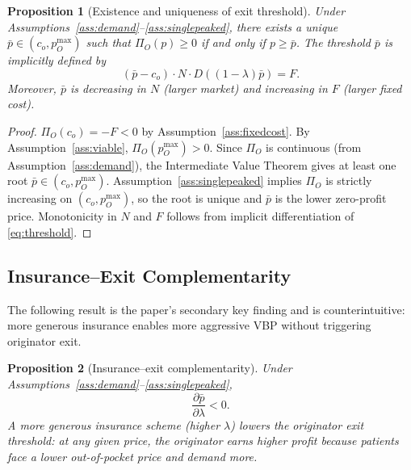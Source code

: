 \documentclass[12pt]{article}
\theoremstyle{plain}
\newtheorem{proposition}{Proposition}
\theoremstyle{definition}
\theoremstyle{remark}
\newcommand{\pbar}{\bar{p}}
\newcommand{\1}{\mathbf{1}}
\begin{document}
\begin{proposition}[Existence and uniqueness of exit threshold]
\label{prop:threshold}
Under Assumptions~\ref{ass:demand}--\ref{ass:singlepeaked}, there exists a unique $\pbar \in (c_o, p_O^{\max})$ such that $\Pi_O(p) \geq 0$ if and only if $p \geq \pbar$. The threshold $\pbar$ is implicitly defined by
\begin{equation}
(\pbar - c_o)\cdot N \cdot D\!\left((1-\lambda)\pbar\right) = F.
\label{eq:threshold}
\end{equation}
Moreover, $\pbar$ is decreasing in $N$ (larger market) and increasing in $F$ (larger fixed cost).
\end{proposition}

\begin{proof}
$\Pi_O(c_o) = -F < 0$ by Assumption~\ref{ass:fixedcost}. By Assumption~\ref{ass:viable}, $\Pi_O(p_O^{\max}) > 0$. Since $\Pi_O$ is continuous (from Assumption~\ref{ass:demand}), the Intermediate Value Theorem gives at least one root $\pbar \in (c_o, p_O^{\max})$. Assumption~\ref{ass:singlepeaked} implies $\Pi_O$ is strictly increasing on $(c_o, p_O^{\max})$, so the root is unique and $\pbar$ is the lower zero-profit price. Monotonicity in $N$ and $F$ follows from implicit differentiation of \eqref{eq:threshold}.
\end{proof}

\subsection{Insurance--Exit Complementarity}

The following result is the paper's secondary key finding and is counterintuitive: more generous insurance enables more aggressive VBP without triggering originator exit.

\begin{proposition}[Insurance--exit complementarity]
\label{prop:complement}
Under Assumptions~\ref{ass:demand}--\ref{ass:singlepeaked},
\begin{equation}
\frac{\partial\pbar}{\partial\lambda} < 0.
\label{eq:complement}
\end{equation}
A more generous insurance scheme (higher $\lambda$) lowers the originator exit threshold: at any given price, the originator earns higher profit because patients face a lower out-of-pocket price and demand more.
\end{proposition}
\end{document}
